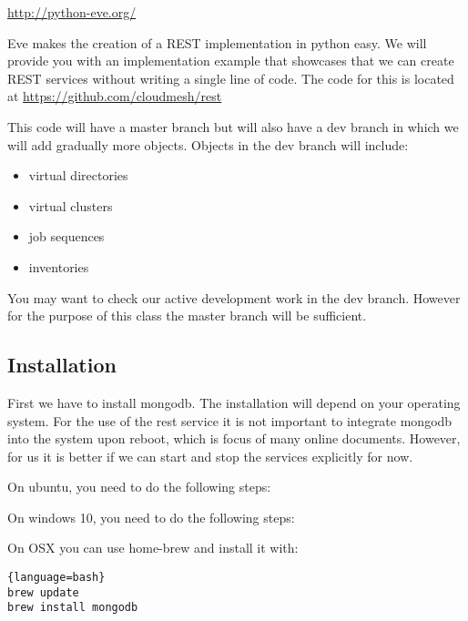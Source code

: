 \url{http://python-eve.org/}

Eve makes the creation of a REST implementation in python easy.  We
will provide you with an implementation example that showcases that we
can create REST services without writing a single line of code. The
code for this is located at \url{https://github.com/cloudmesh/rest}

This code will have a master branch but will also have a dev branch in
which we will add gradually more objects. Objects in the dev branch will
include:

\begin{itemize}
\item
 virtual directories
\item
 virtual clusters
\item
 job sequences
\item
 inventories
\end{itemize}

You may want to check our active development work in the dev branch.
However for the purpose of this class the master branch will be
sufficient.

\subsection{Installation}\label{installation}

First we have to install mongodb. The installation will depend on your
operating system. For the use of the rest service it is not important to
integrate mongodb into the system upon reboot, which is focus of many
online documents. However, for us it is better if we can start and stop
the services explicitly for now.

On ubuntu, you need to do the following steps:


On windows 10, you need to do the following steps:


On OSX you can use home-brew and install it with:

\begin{lstlisting}{language=bash}
brew update
brew install mongodb
\end{lstlisting}

